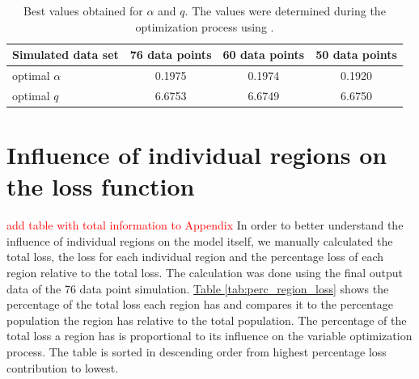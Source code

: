 \begin{table}
	\centering
	\caption{Best values obtained for $\alpha$ and $q$. The values were determined during the optimization process
		using .}
	\begin{tabular}{|l||c|c|c|}
		\hline
		Simulated data set & 76 data points & 60 data points & 50 data points \\ \hline \hline
		optimal $\alpha$ & 0.1975 & 0.1974 & 0.1920\\ \hline
		optimal $q$ & 6.6753 & 6.6749 & 6.6750 \\ \hline
	\end{tabular}
	\label{tab:optimized_var}
\end{table}


\section{Influence of individual regions on the loss function}
\textcolor{red}{add table with total information to Appendix}
In order to better understand the influence of individual regions on the model itself, we manually calculated the total
loss, the loss for each individual region and the percentage loss of each region relative to the total loss. The
calculation was done using the final output data of the 76 data point simulation.
\hyperref[tab:perc_region_loss]{Table \ref*{tab:perc_region_loss}} shows the percentage of the total loss each region
has and compares it to the percentage population the region has relative to the total population. The percentage
of the total loss a region has is proportional to its influence on the variable optimization process.
The table is sorted in descending order from highest percentage loss contribution to lowest.\newline

